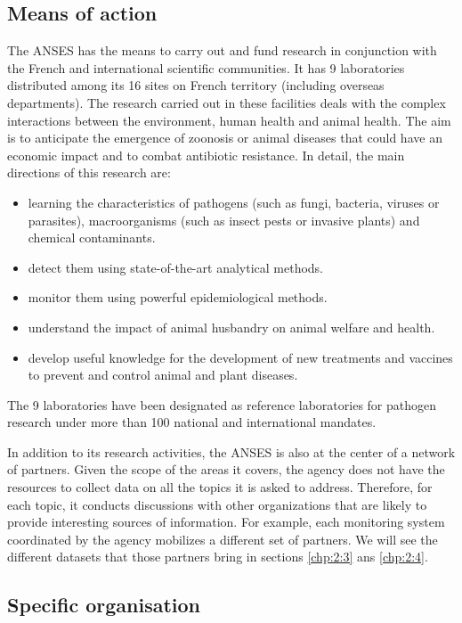 \subsection{Means of action}

The ANSES has the means to carry out and fund research in conjunction with the French and international scientific communities. It has 9 laboratories distributed among its 16 sites on French territory (including overseas departments). The research carried out in these facilities deals with the complex interactions between the environment, human health and animal health. The aim is to anticipate the emergence of zoonosis or animal diseases that could have an economic impact and to combat antibiotic resistance. In detail, the main directions of this research are:
\begin{itemize}
\item learning the characteristics of pathogens (such as fungi, bacteria, viruses or parasites), macroorganisms (such as insect pests or invasive plants) and chemical contaminants. 
\item detect them using state-of-the-art analytical methods.
\item monitor them using powerful epidemiological methods.
\item understand the impact of animal husbandry on animal welfare and health.
\item develop useful knowledge for the development of new treatments and vaccines to prevent and control animal and plant diseases. 
\end{itemize} 
The 9 laboratories have been designated as reference laboratories for pathogen research under more than 100 national and international mandates.

In addition to its research activities, the ANSES is also at the center of a network of partners. Given the scope of the areas it covers, the agency does not have the resources to collect data on all the topics it is asked to address. Therefore, for each topic, it conducts discussions with other organizations that are likely to provide interesting sources of information. For example, each monitoring system coordinated by the agency mobilizes a different set of partners. We will see the different datasets that those partners bring in sections \ref{chp:2:3} ans \ref{chp:2:4}. 

\subsection{Specific organisation}

